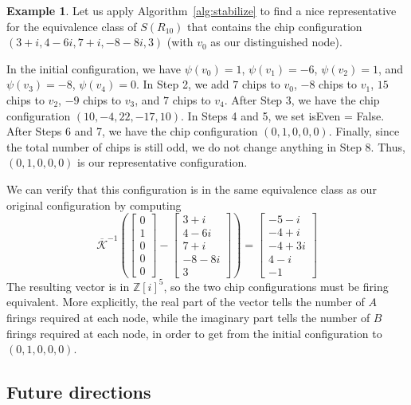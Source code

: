\documentclass[12p]{amsart}
\numberwithin{equation}{section}
\theoremstyle{plain}
\theoremstyle{definition}
\newtheorem{example}[thm]{Example}
\newcommand{\Z}{\mathbb {Z}}
\begin{document}
\begin{example}
    Let us apply Algorithm~\ref{alg:stabilize} to find a nice representative for the equivalence class of $S(R_{10})$ that contains the chip configuration $(3+i, 4-6i, 7+i, -8-8i, 3)$ (with $v_0$ as our distinguished node). 

    In the initial configuration, we have $\psi(v_0) = 1$, $\psi(v_1) = -6$, $\psi(v_2) = 1$, and $\psi(v_3) = -8$, $\psi(v_4) = 0$. In Step 2, we add $7$ chips to $v_0$, $-8$ chips to $v_1$, $15$ chips to $v_2$, $-9$ chips to $v_3$, and $7$ chips to $v_4$. After Step 3, we have the chip configuration $(10,-4,22,-17,10)$. In Steps 4 and 5, we set isEven = False. After Steps 6 and 7, we have the chip configuration $(0, 1, 0, 0, 0)$. Finally, since the total number of chips is still odd, we do not change anything in Step 8. Thus, $(0, 1, 0, 0, 0)$ is our representative configuration. 

    We can verify that this configuration is in the same equivalence class as our original configuration by computing 
    \[ \overline{\mathcal K}^{-1}\left (\begin{bmatrix} 0 \\ 1 \\ 0 \\ 0 \\ 0\end{bmatrix}-\begin{bmatrix} 3+i \\ 4 - 6i \\ 7+i \\ -8-8i \\ 3\end{bmatrix}\right ) = \begin{bmatrix} -5 - i \\ -4 + i \\ -4 + 3i \\ 4 - i\\ -1\end{bmatrix}\]
    The resulting vector is in $\Z[i]^5$, so the two chip configurations must be firing equivalent. More explicitly, the real part of the vector tells the number of $A$ firings required at each node, while the imaginary part tells the number of $B$ firings required at each node, in order to get from the initial configuration to $(0,1,0,0,0)$.
\end{example}

\subsection{Future directions}
\end{document}
